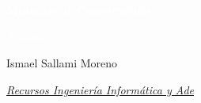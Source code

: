\documentclass[12pt]{book} %
\begin{document}
\begin{titlepage}
\begin{center}
        \vspace{5cm} %
        {\Huge \bfseries\scshape\textcolor{white}{Modelos de
Computación} \par}
        \vspace{0.5cm}
        {\Large \itshape\textcolor{white}{Temario} \par}
        \vspace{0.5cm}


        \vfill
        

        \begin{flushright}
            {Ismael Sallami Moreno \par}
            {\small \itshape \href{https://elblogdeismael.github.io}{Recursos Ingeniería Informática y Ade} \par}
        \end{flushright}
        \vspace{0.3cm}
        
        
    \end{center}
    
    \restoregeometry
\end{titlepage}


\end{document}

